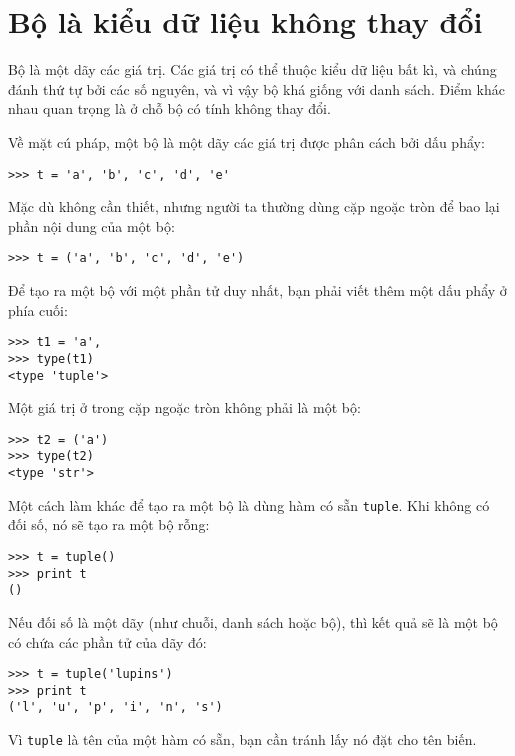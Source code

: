 \documentclass[11pt]{book}
\begin{document}
\section{Bộ là kiểu dữ liệu không thay đổi}


Bộ là một dãy các giá trị. Các giá trị có thể thuộc kiểu dữ liệu bất kì,
và chúng đánh thứ tự bởi các số nguyên, và vì vậy bộ khá giống với
danh sách. Điểm khác nhau quan trọng là ở chỗ bộ có tính không thay đổi.


Về mặt cú pháp, một bộ là một dãy các giá trị được phân cách bởi dấu phẩy:

\beforeverb
\begin{verbatim}
>>> t = 'a', 'b', 'c', 'd', 'e'
\end{verbatim}
\afterverb
%
Mặc dù không cần thiết, nhưng người ta thường dùng cặp ngoặc tròn
để bao lại phần nội dung của một bộ:


\beforeverb
\begin{verbatim}
>>> t = ('a', 'b', 'c', 'd', 'e')
\end{verbatim}
\afterverb
%
Để tạo ra một bộ với một phần tử duy nhất, bạn phải viết thêm một dấu phẩy
ở phía cuối:


\beforeverb
\begin{verbatim}
>>> t1 = 'a',
>>> type(t1)
<type 'tuple'>
\end{verbatim}
\afterverb
%
Một giá trị ở trong cặp ngoặc tròn không phải là một bộ:

\beforeverb
\begin{verbatim}
>>> t2 = ('a')
>>> type(t2)
<type 'str'>
\end{verbatim}
\afterverb
%
Một cách làm khác để tạo ra một bộ là dùng hàm có sẵn {\tt tuple}.
Khi không có đối số, nó sẽ tạo ra một bộ rỗng:


\beforeverb
\begin{verbatim}
>>> t = tuple()
>>> print t
()
\end{verbatim}
\afterverb
%
Nếu đối số là một dãy (như chuỗi, danh sách hoặc bộ), thì kết quả sẽ
là một bộ có chứa các phần tử của dãy đó:

\beforeverb
\begin{verbatim}
>>> t = tuple('lupins')
>>> print t
('l', 'u', 'p', 'i', 'n', 's')
\end{verbatim}
\afterverb
%
Vì {\tt tuple} là tên của một hàm có sẵn, bạn cần tránh lấy nó đặt cho
tên biến.
\end{document}
